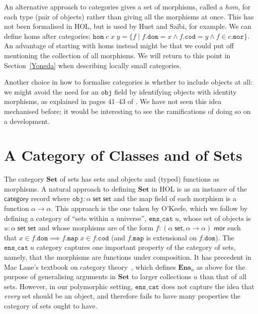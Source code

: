 \documentclass[twoside,titlepage,11pt]{article}
\begin{document}
An alternative approach to categories gives a set of morphisms, called a \emph{hom}, for each type (pair of objects) rather than giving all the morphisms at once.
This has not been formalised in HOL, but is used by Huet and Sa{\"i}bi, for example.
We can define homs after categories: $\mathtt{hom}\;c\;x\;y=\{f\mid f.\mathtt{dom}=x\land f.\mathtt{cod}=y\land f\in c.\mathtt{mor}\}$.
An advantage of starting with homs instead might be that we could put off mentioning the collection of all morphisms.
We will return to this point in Section~\ref{Yoneda} when describing locally small categories.

Another choice in how to formalise categories is whether to include objects at all: we might avoid the need for an $\mathtt{obj}$ field by identifying objects with identity morphisms, as explained in pages 41--43 of \cite{DBLP:books/daglib/0023249}.
We have not seen this idea mechanised before; it would be interesting to see the ramifications of doing so on a development.
\section{A Category of Classes and of Sets}%
\label{Set}
\newcommand{\Set}{\ensuremath{\mathbf{Set}}}
The category $\Set$ of sets has sets and objects and (typed) functions as morphisms.
A natural approach to defining $\Set$ in HOL is as an instance of the $\mathsf{category}$ record where $\mathtt{obj}:\alpha\;\mathsf{set}\;\mathsf{set}$ and the map field of each morphism is a function $\alpha\to\alpha$.
This approach is the one taken by O'Keefe, which we follow by defining a category of ``sets within a universe'', $\mathtt{ens\_cat}\;u$, whose set of objects is $u:\alpha\;\mathsf{set}\;\mathsf{set}$ and whose morphisms are of the form $f:(\alpha\;\mathsf{set},\alpha\to\alpha)\;\mathsf{mor}$ such that $x\in f.\mathtt{dom}\implies f.\mathtt{map}\;x\in f.\mathtt{cod}$ (and $f.\mathtt{map}$ is extensional on $f.\mathtt{dom}$).
The $\mathtt{ens\_cat}\;u$ category captures one important property of the category of sets, namely, that the morphisms are functions under composition.
It has precedent in Mac Lane's textbook on category theory~\cite{MacLaneCFTWM}, which defines $\mathbf{Ens}_u$ as above for the purpose of generalising arguments in $\Set$ to larger collections $u$ than that of all sets.
However, in our polymorphic setting, $\mathtt{ens\_cat}$ does not capture the idea that \emph{every} set should be an object, and therefore fails to have many properties the category of sets ought to have.
\end{document}
